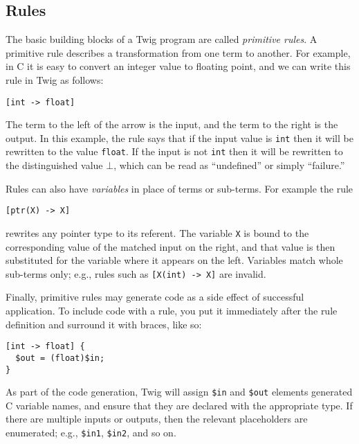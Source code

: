 \subsection{Rules}


The basic building blocks of a Twig program are called \emph{primitive rules}. A primitive rule describes a transformation from one term to another. For example, in C it is easy to convert an integer value to floating point, and we can write this rule in Twig as follows:

\begin{verbatim}
[int -> float]
\end{verbatim}

The term to the left of the arrow is the input, and the term to the right is the output. In this example, the rule says that if the input value is \texttt{int} then it will be rewritten to the value \texttt{float}. If the input is not \texttt{int} then it will be rewritten to the distinguished value $\bot$, which can be read as ``undefined'' or simply ``failure.''

Rules can also have \emph{variables} in place of terms or sub-terms. For example the rule

\begin{verbatim}
[ptr(X) -> X]
\end{verbatim}

rewrites any pointer type to its referent. The variable \texttt{X} is bound to the corresponding value of the matched input on the right, and that value is then substituted for the variable where it appears on the left. Variables match whole sub-terms only; e.g., rules such as \texttt{[X(int) -> X]} are invalid.

Finally, primitive rules may generate code as a side effect of successful application. To include code with a rule, you put it immediately after the rule definition and surround it with braces, like so:

\begin{verbatim}
[int -> float] {
  $out = (float)$in;
}
\end{verbatim}

As part of the code generation, Twig will assign \texttt{\$in} and \texttt{\$out} elements generated C variable names, and ensure that they are declared with the appropriate type. If there are multiple inputs or outputs, then the relevant placeholders are enumerated; e.g., \texttt{\$in1}, \texttt{\$in2}, and so on.

